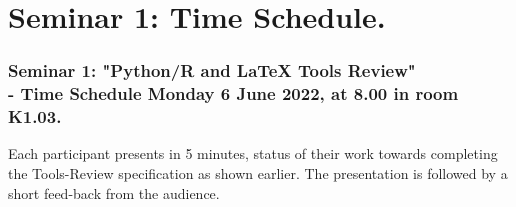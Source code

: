 \documentclass{beamer}
\begin{document}
%
%


\section{Seminar 1: Time Schedule.}
\begin{frame}[fragile]
\frametitle{Seminar 1: "Python/R and \LaTeX \hspace*{0.5mm} Tools Review"\\
 - Time Schedule Monday 6 June 2022, at 8.00 in room K1.03.}
\footnotesize{
Each participant presents in 5 minutes, status of their work towards completing the Tools-Review specification
as shown earlier. The presentation is followed by a short feed-back from the audience.

}
\end{frame}


\end{document}

